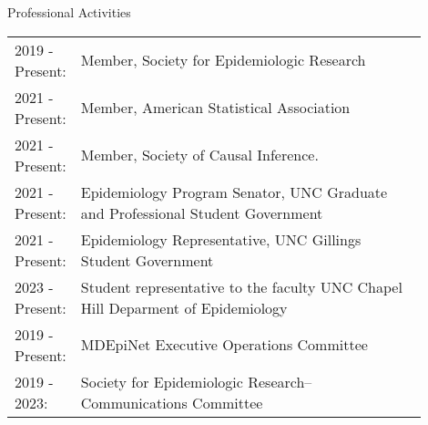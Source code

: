 \documentclass{resume} %
\begin{document}
\begin{rSection}{Professional Activities}
   \begin{tabular}{lp{0.90\linewidth}}
   2019 - Present:& Member, Society for Epidemiologic Research\\
   2021 - Present: & Member, American Statistical Association\\
   2021 - Present: & Member, Society of  Causal Inference.\\
   2021 - Present: & Epidemiology Program Senator,  UNC Graduate and Professional Student Government\\ 
   2021 - Present: & Epidemiology Representative, UNC Gillings Student Government \\
   2023 - Present: & Student representative to the faculty UNC Chapel Hill Deparment of Epidemiology\\
   2019 - Present: & MDEpiNet Executive Operations Committee\\
   2019 - 2023:& Society for Epidemiologic Research--Communications Committee
   \end{tabular}
   \end{rSection}
\end{document}
